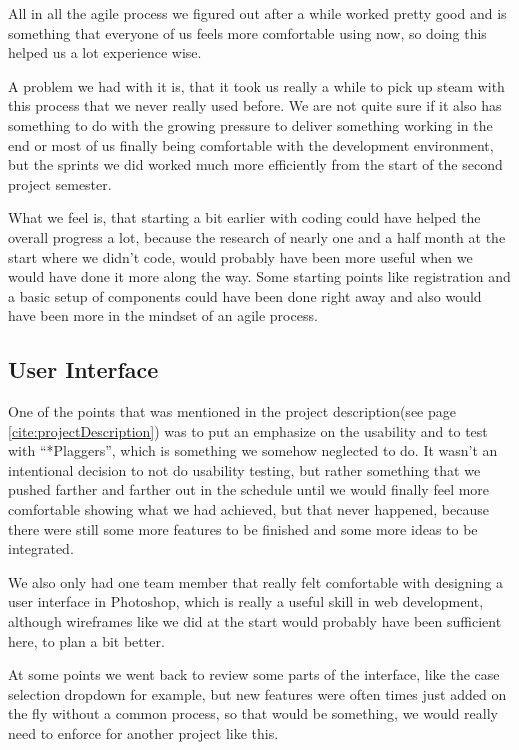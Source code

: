 All in all the agile process we figured out after a while worked pretty good and is something that everyone of us feels more comfortable using now, so doing this helped us a lot experience wise. 

A problem we had with it is, that it took us really a while to pick up steam with this process that we never really used before. We are not quite sure if it also has something to do with the growing pressure to deliver something working in the end or most of us finally being comfortable with the development environment, but the sprints we did worked much more efficiently from the start of the second project semester.

What we feel is, that starting a bit earlier with coding could have helped the overall progress a lot, because the research of nearly one and a half month at the start where we didn't code, would probably have been more useful when we would have done it more along the way. Some starting points like registration and a basic setup of components could have been done right away and also would have been more in the mindset of an agile process.

\subsection{User Interface}

One of the points that was mentioned in the project description(see page \ref{cite:projectDescription}) was to put an emphasize on the usability and to test with \enquote{*Plaggers}, which is something we somehow neglected to do. It wasn't an intentional decision to not do usability testing, but rather something that we pushed farther and farther out in the schedule until we would finally feel more comfortable showing what we had achieved, but that never happened, because there were still some more features to be finished and some more ideas to be integrated.

We also only had one team member that really felt comfortable with designing a user interface in Photoshop, which is really a useful skill in web development, although wireframes like we did at the start would probably have been sufficient here, to plan a bit better. 

At some points we went back to review some parts of the interface, like the case selection dropdown for example, but new features were often times just added on the fly without a common process, so that would be something, we would really need to enforce for another project like this.

